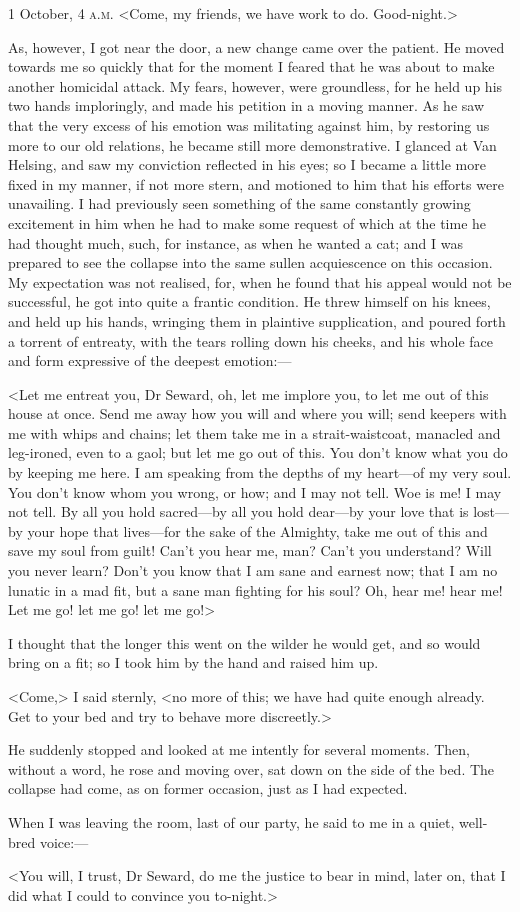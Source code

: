 \begin{diary}{1 October, 4 \textsc{a.m.}}
<Come, my friends, we have work to do. Good-night.>

As, however, I got near the door, a new change came over the patient. He moved towards me so quickly that for the moment I feared that he was about to make another homicidal attack. My fears, however, were groundless, for he held up his two hands imploringly, and made his petition in a moving manner. As he saw that the very excess of his emotion was militating against him, by restoring us more to our old relations, he became still more demonstrative. I glanced at Van Helsing, and saw my conviction reflected in his eyes; so I became a little more fixed in my manner, if not more stern, and motioned to him that his efforts were unavailing. I had previously seen something of the same constantly growing excitement in him when he had to make some request of which at the time he had thought much, such, for instance, as when he wanted a cat; and I was prepared to see the collapse into the same sullen acquiescence on this occasion. My expectation was not realised, for, when he found that his appeal would not be successful, he got into quite a frantic condition. He threw himself on his knees, and held up his hands, wringing them in plaintive supplication, and poured forth a torrent of entreaty, with the tears rolling down his cheeks, and his whole face and form expressive of the deepest emotion:—

<Let me entreat you, Dr Seward, oh, let me implore you, to let me out of this house at once. Send me away how you will and where you will; send keepers with me with whips and chains; let them take me in a strait-waistcoat, manacled and leg-ironed, even to a gaol; but let me go out of this. You don't know what you do by keeping me here. I am speaking from the depths of my heart—of my very soul. You don't know whom you wrong, or how; and I may not tell. Woe is me! I may not tell. By all you hold sacred—by all you hold dear—by your love that is lost—by your hope that lives—for the sake of the Almighty, take me out of this and save my soul from guilt! Can't you hear me, man? Can't you understand? Will you never learn? Don't you know that I am sane and earnest now; that I am no lunatic in a mad fit, but a sane man fighting for his soul? Oh, hear me! hear me! Let me go! let me go! let me go!>

I thought that the longer this went on the wilder he would get, and so would bring on a fit; so I took him by the hand and raised him up.

<Come,> I said sternly, <no more of this; we have had quite enough already. Get to your bed and try to behave more discreetly.>

He suddenly stopped and looked at me intently for several moments. Then, without a word, he rose and moving over, sat down on the side of the bed. The collapse had come, as on former occasion, just as I had expected.

When I was leaving the room, last of our party, he said to me in a quiet, well-bred voice:—

<You will, I trust, Dr Seward, do me the justice to bear in mind, later on, that I did what I could to convince you to-night.>
\end{diary}